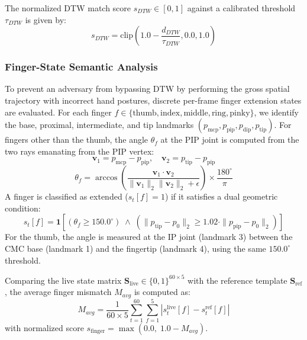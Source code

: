\documentclass[conference]{IEEEtran}
\begin{document}
The normalized DTW match score $s_{DTW} \in [0, 1]$ against a calibrated threshold $\tau_{DTW}$ is given by:
\begin{equation}
s_{DTW} = \text{clip}\left(1.0 - \frac{d_{DTW}}{\tau_{DTW}}, 0.0, 1.0\right)
\label{eq:score_dtw}
\end{equation}

\subsubsection{Finger-State Semantic Analysis}
To prevent an adversary from bypassing DTW by performing the gross spatial trajectory with incorrect hand postures, discrete per-frame finger extension states are evaluated. For each finger $f \in \{\text{thumb}, \text{index}, \text{middle}, \text{ring}, \text{pinky}\}$, we identify the base, proximal, intermediate, and tip landmarks $(p_{\text{mcp}}, p_{\text{pip}}, p_{\text{dip}}, p_{\text{tip}})$. For fingers other than the thumb, the angle $\theta_f$ at the PIP joint is computed from the two rays emanating from the PIP vertex:
\begin{equation}
\mathbf{v}_1 = p_{\text{mcp}} - p_{\text{pip}}, \quad \mathbf{v}_2 = p_{\text{tip}} - p_{\text{pip}}
\end{equation}
\begin{equation}
\theta_f = \arccos\left( \frac{\mathbf{v}_1 \cdot \mathbf{v}_2}{\|\mathbf{v}_1\|_2 \|\mathbf{v}_2\|_2 + \epsilon} \right) \times \frac{180^\circ}{\pi}
\end{equation}
A finger is classified as extended ($s_t[f] = 1$) if it satisfies a dual geometric condition:
\begin{equation}
s_t[f] = \mathbf{1}\left[ (\theta_f \ge 150.0^\circ) \;\wedge\; (\|p_{\text{tip}} - p_0\|_2 \ge 1.02 \cdot \|p_{\text{pip}} - p_0\|_2) \right]
\label{eq:finger_state}
\end{equation}
For the thumb, the angle is measured at the IP joint (landmark 3) between the CMC base (landmark 1) and the fingertip (landmark 4), using the same $150.0^\circ$ threshold.

Comparing the live state matrix $\mathbf{S}_{\text{live}} \in \{0, 1\}^{60 \times 5}$ with the reference template $\mathbf{S}_{\text{ref}}$, the average finger mismatch $M_{avg}$ is computed as:
\begin{equation}
M_{avg} = \frac{1}{60 \times 5} \sum_{t=1}^{60} \sum_{f=1}^{5} |s_t^{\text{live}}[f] - s_t^{\text{ref}}[f]|
\end{equation}
with normalized score $s_{\text{finger}} = \max(0.0,\; 1.0 - M_{avg})$.
\end{document}
